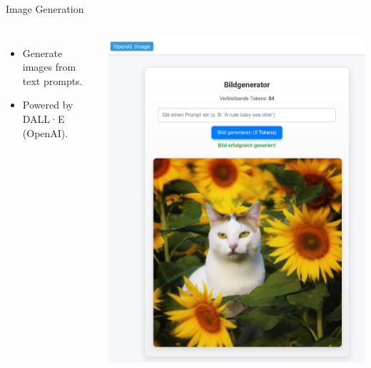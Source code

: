 \documentclass{beamer}
\begin{document}
\begin{frame}{Image Generation}
  \begin{columns}
      \begin{itemize}
        \item Generate images from text prompts.
        \item Powered by DALL·E (OpenAI).
      \end{itemize}
      \centering
      \includegraphics[width=\textwidth]{image-generation.png}
  \end{columns}
\end{frame}
\end{document}
